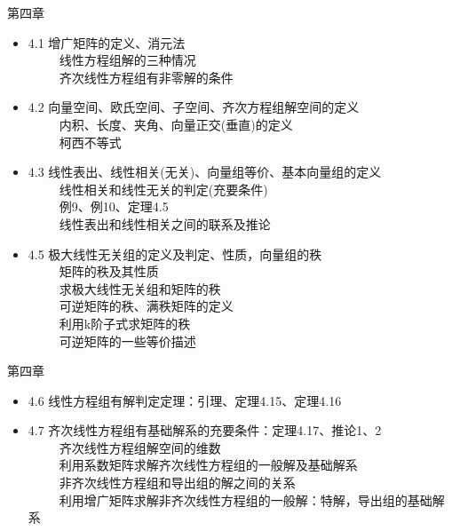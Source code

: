 \documentclass[compress,mathserif,cjk]{beamer}
\theoremstyle{remark}
\numberwithin{equation}{section}
\begin{document}
\begin{CJK}{UTF8}{gbsn}
\begin{frame}{第四章}\small
\begin{itemize}
  \item 4.1 增广矩阵的定义、消元法\\
  \ \ \ \ \ 线性方程组解的三种情况\\
  \ \ \ \ \ 齐次线性方程组有非零解的条件
  \item 4.2 向量空间、欧氏空间、子空间、齐次方程组解空间的定义\\
  \ \ \ \ \ 内积、长度、夹角、向量正交(垂直)的定义\\
  \ \ \ \ \ 柯西不等式
  \item 4.3 线性表出、线性相关(无关)、向量组等价、基本向量组的定义\\
  \ \ \ \ \ 线性相关和线性无关的判定(充要条件)\\
  \ \ \ \ \ 例9、例10、定理4.5\\
  \ \ \ \ \ 线性表出和线性相关之间的联系及推论
  \item 4.5 极大线性无关组的定义及判定、性质，向量组的秩\\
   \ \ \ \ \ 矩阵的秩及其性质\\
    \ \ \ \ \ 求极大线性无关组和矩阵的秩\\
   \ \ \ \ \ 可逆矩阵的秩、满秩矩阵的定义\\
   \ \ \ \ \ 利用k阶子式求矩阵的秩\\
    \ \ \ \ \ 可逆矩阵的一些等价描述
\end{itemize}
\end{frame}

\begin{frame}{第四章}
\begin{itemize}
 \item 4.6 线性方程组有解判定定理：引理、定理4.15、定理4.16
 \item 4.7 齐次线性方程组有基础解系的充要条件：定理4.17、推论1、2\\
 \ \ \ \ \ 齐次线性方程组解空间的维数\\
 \ \ \ \ \ 利用系数矩阵求解齐次线性方程组的一般解及基础解系\\
 \ \ \ \ \ 非齐次线性方程组和导出组的解之间的关系\\
 \ \ \ \ \ 利用增广矩阵求解非齐次线性方程组的一般解：特解，导出组的基础解系
\end{itemize}
\end{frame}


\end{CJK}
\end{document}
